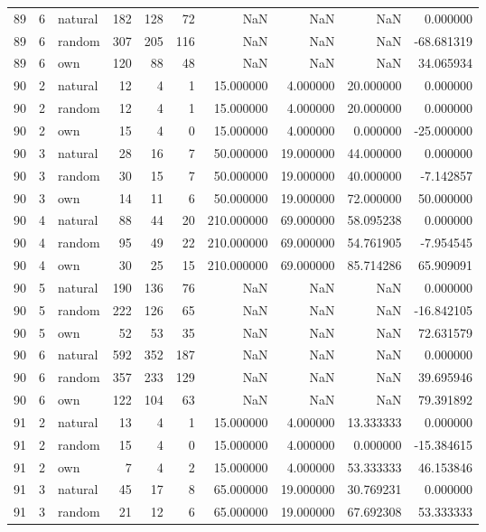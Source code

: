 \begin{table}[htbp]
\begin{tabular}{rrlrrrrrrr}
89 & 6 & natural & 182 & 128 & 72 & NaN & NaN & NaN & 0.000000 \\
89 & 6 & random & 307 & 205 & 116 & NaN & NaN & NaN & -68.681319 \\
89 & 6 & own & 120 & 88 & 48 & NaN & NaN & NaN & 34.065934 \\
90 & 2 & natural & 12 & 4 & 1 & 15.000000 & 4.000000 & 20.000000 & 0.000000 \\
90 & 2 & random & 12 & 4 & 1 & 15.000000 & 4.000000 & 20.000000 & 0.000000 \\
90 & 2 & own & 15 & 4 & 0 & 15.000000 & 4.000000 & 0.000000 & -25.000000 \\
90 & 3 & natural & 28 & 16 & 7 & 50.000000 & 19.000000 & 44.000000 & 0.000000 \\
90 & 3 & random & 30 & 15 & 7 & 50.000000 & 19.000000 & 40.000000 & -7.142857 \\
90 & 3 & own & 14 & 11 & 6 & 50.000000 & 19.000000 & 72.000000 & 50.000000 \\
90 & 4 & natural & 88 & 44 & 20 & 210.000000 & 69.000000 & 58.095238 & 0.000000 \\
90 & 4 & random & 95 & 49 & 22 & 210.000000 & 69.000000 & 54.761905 & -7.954545 \\
90 & 4 & own & 30 & 25 & 15 & 210.000000 & 69.000000 & 85.714286 & 65.909091 \\
90 & 5 & natural & 190 & 136 & 76 & NaN & NaN & NaN & 0.000000 \\
90 & 5 & random & 222 & 126 & 65 & NaN & NaN & NaN & -16.842105 \\
90 & 5 & own & 52 & 53 & 35 & NaN & NaN & NaN & 72.631579 \\
90 & 6 & natural & 592 & 352 & 187 & NaN & NaN & NaN & 0.000000 \\
90 & 6 & random & 357 & 233 & 129 & NaN & NaN & NaN & 39.695946 \\
90 & 6 & own & 122 & 104 & 63 & NaN & NaN & NaN & 79.391892 \\
91 & 2 & natural & 13 & 4 & 1 & 15.000000 & 4.000000 & 13.333333 & 0.000000 \\
91 & 2 & random & 15 & 4 & 0 & 15.000000 & 4.000000 & 0.000000 & -15.384615 \\
91 & 2 & own & 7 & 4 & 2 & 15.000000 & 4.000000 & 53.333333 & 46.153846 \\
91 & 3 & natural & 45 & 17 & 8 & 65.000000 & 19.000000 & 30.769231 & 0.000000 \\
91 & 3 & random & 21 & 12 & 6 & 65.000000 & 19.000000 & 67.692308 & 53.333333 \\

\end{tabular}
\end{table}
